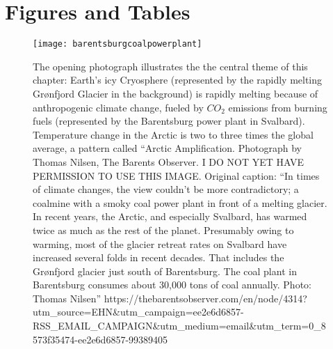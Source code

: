 \documentclass[amstex,12pt]{book}
\begin{document}
\section{Figures and Tables}

\begin{figure}[p]
\centering
\texttt{[image: barentsburgcoalpowerplant]}%
\caption{The opening photograph illustrates the the central theme of this chapter: Earth's icy Cryosphere (represented by the rapidly melting Gr\o nfjord Glacier in the background) is rapidly melting because of anthropogenic climate change, fueled by $CO_2$ emissions from burning  fuels (represented by the Barentsburg power plant in Svalbard). Temperature change in the Arctic is two to three times the global average, a pattern called ``Arctic Amplification. Photograph by Thomas Nilsen, The Barents Observer. I DO NOT YET HAVE PERMISSION TO USE THIS IMAGE. Original caption: ``In times of climate changes, the view couldn't be more contradictory; a coalmine with a smoky coal power plant in front of a melting glacier. In recent years, the Arctic, and especially Svalbard, has warmed twice as much as the rest of the planet. Presumably owing to warming, most of the glacier retreat rates on Svalbard have increased several folds in recent decades. That includes the Grønfjord glacier just south of Barentsburg. The coal plant in Barentsburg consumes about 30,000 tons of coal annually.  Photo: Thomas Nilsen'' https://thebarentsobserver.com/en/node/4314?utm\_source=EHN\&utm\_campaign=ee2e6d6857-RSS\_EMAIL\_CAMPAIGN\&utm\_medium=email\&utm\_term=0\_8573f35474-ee2e6d6857-99389405} 
\label{fig:Barentsburg}
\end{figure}
\end{document}
